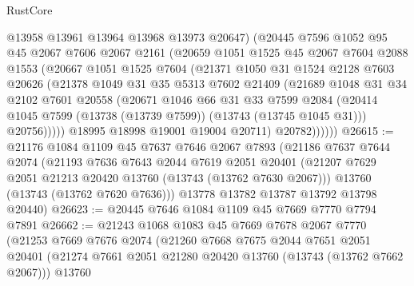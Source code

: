 \begin{lexlean}{RustCore}
\begin{coremodule}
                @13958
                @13961
                @13964
                @13968
                @13973
                @20647)
              (@20445
                @7596
                @1052
                @95
                @45
                @2067
                @7606
                @2067
                @2161
                (@20659
                  @1051
                  @1525
                  @45
                  @2067
                  @7604
                  @2088
                  @1553
                  (@20667
                    @1051
                    @1525
                    @7604
                    (@21371
                      @1050
                      @31
                      @1524
                      @2128
                      @7603
                      @20626
                      (@21378
                        @1049
                        @31
                        @35
                        @5313
                        @7602
                        @21409
                        (@21689
                          @1048
                          @31
                          @34
                          @2102
                          @7601
                          @20558
                          (@20671
                            @1046
                            @66
                            @31
                            @33
                            @7599
                            @2084
                            (@20414 @1045 @7599 (@13738 (@13739 @7599)) (@13743 (@13745 @1045 @31)))
                            @20756)))))
                  @18995
                  @18998
                  @19001
                  @19004
                  @20711)
                @20782))))))
@26615 := @21176
    @1084
    @1109
    @45
    @7637
    @7646
    @2067
    @7893
    (@21186
      @7637
      @7644
      @2074
      (@21193
        @7636
        @7643
        @2044
        @7619
        @2051
        @20401
        (@21207 @7629 @2051 @21213 @20420 @13760 (@13743 (@13762 @7630 @2067)))
        @13760
        (@13743 (@13762 @7620 @7636)))
      @13778
      @13782
      @13787
      @13792
      @13798
      @20440)
@26623 := @20445 @7646 @1084 @1109 @45 @7669 @7770 @7794 @7891
@26662 := @21243
    @1068
    @1083
    @45
    @7669
    @7678
    @2067
    @7770
    (@21253
      @7669
      @7676
      @2074
      (@21260
        @7668
        @7675
        @2044
        @7651
        @2051
        @20401
        (@21274 @7661 @2051 @21280 @20420 @13760 (@13743 (@13762 @7662 @2067)))
        @13760

\end{coremodule}
\end{lexlean}

